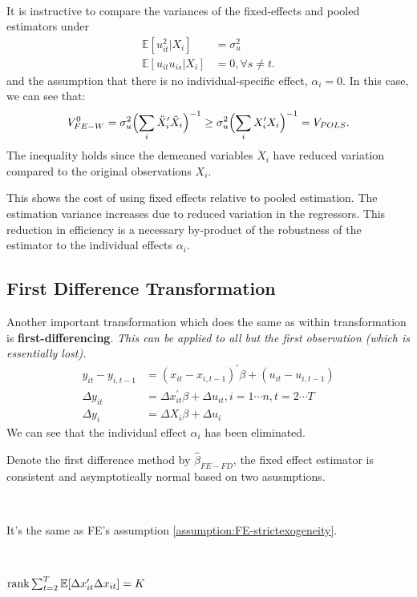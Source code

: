 \begin{remark}[FE VS. POLS]
    \

    It is instructive to compare the variances of the fixed-effects and pooled estimators under
    \begin{align*}
        \mathbb{E}[u_{it}^2 | X_i] &= \sigma_u^2 \\
        \mathbb{E}[u_{it} u_{is} | X_i] &= 0, \forall s \neq t.
    \end{align*}
    and the assumption that there is no individual-specific effect, $\alpha_i = 0$.
    In this case, we can see that:
    \begin{gather*}
        V_{FE-W}^0 = \sigma_u^2 \Bigl( \sum_{i} \ddot{X}_i^{\prime} \ddot{X}_i \Bigr)^{-1} \geq \sigma_u^2 \Bigl( \sum_{i} X_i^{\prime} X_i \Bigr)^{-1} = V_{POLS}.
    \end{gather*}
    The inequality holds since the demeaned variables $\ddot{X}_i$ have reduced variation compared to the original observations $X_i$.

    This shows the cost of using fixed effects relative to pooled estimation. 
    The estimation variance increases due to reduced variation in the regressors. 
    This reduction in efficiency is a necessary by-product of the robustness of the estimator to the individual effects $\alpha_i$.
\end{remark}

\subsection{First Difference Transformation}

Another important transformation which does the same as within transformation is \textbf{first-differencing}.
\emph{This can be applied to all but the first
observation (which is essentially lost).}
\begin{align*}
    y_{it} - y_{i, t-1} &= (x_{it} - x_{i, t-1})^{\prime} \beta + (u_{it} - u_{i, t-1}) \\
    \Delta y_{it} &= \Delta x_{it}^{\prime} \beta + \Delta u_{it}, i=1 \cdots n, t=2 \cdots T \\
    \Delta y_i &= \Delta X_i \beta + \Delta u_i 
\end{align*}
We can see that the individual effect $\alpha_i$ has been eliminated.

Denote the first difference method by $\hat{\beta}_{FE-FD}$, 
the fixed effect estimator is consistent and asymptotically normal based on two asusmptions.
\begin{assumption}\label{assumption:FD1}
    \

    It's the same as FE's assumption \ref{assumption:FE-strictexogeneity}.
\end{assumption}
\begin{assumption}\label{assumption:FD2}
    \

    $\operatorname{rank} \sum_{t=2}^{T} \mathbb{E}[\Delta x_{it}^{\prime} \Delta x_{it}] = K$
\end{assumption}

